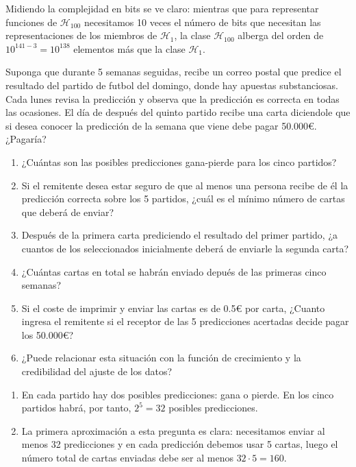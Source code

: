 \documentclass[a4paper, 11pt]{article}
\begin{document}
\begin{solucion}
          Midiendo la complejidad en bits se ve claro: mientras que para representar funciones de $\mathcal{H}_{100}$ necesitamos 10 veces el número de bits que necesitan las representaciones de los miembros de $\mathcal{H}_1$, la clase $\mathcal{H}_{100}$ alberga del orden de $10^{141-3} = 10^{138}$ elementos más que la clase $\mathcal{H}_1$.

      \begin{ejercicio}
          Suponga que durante 5 semanas seguidas, recibe un correo postal que predice el resultado del partido de futbol del domingo, donde hay apuestas substanciosas. Cada lunes revisa la predicción y observa que la predicción es correcta en todas las ocasiones. El día de después del quinto partido recibe una carta diciendole que si desea conocer la predicción de la semana que viene debe pagar 50.000€. ¿Pagaría?
          \begin{enumerate}
              \item ¿Cuántas son las posibles predicciones gana-pierde para los cinco partidos?
              \item Si el remitente desea estar seguro de que al menos una persona recibe de él la predicción correcta sobre los 5 partidos, ¿cuál es el mínimo número de cartas que deberá de enviar?
              \item Después de la primera carta prediciendo el resultado del primer partido, ¿a cuantos de los seleccionados inicialmente deberá de enviarle la segunda carta?
              \item ¿Cuántas cartas en total se habrán enviado depués de las primeras cinco semanas?
              \item Si el coste de imprimir y enviar las cartas es de 0.5€ por carta, ¿Cuanto ingresa el remitente si el receptor de las 5 predicciones acertadas decide pagar los 50.000€?
              \item ¿Puede relacionar esta situación con la función de crecimiento y la credibilidad del ajuste de los datos?
          \end{enumerate}
      \end{ejercicio}

      \begin{solucion}
          \begin{enumerate}
              \item En cada partido hay dos posibles predicciones: gana o pierde. En los cinco partidos habrá, por tanto, $2^5  = 32$ posibles predicciones.
              \item La primera aproximación a esta pregunta es clara: necesitamos enviar al menos 32 predicciones y en cada predicción debemos usar 5 cartas, luego el número total de cartas enviadas debe ser al menos $32\cdot5 = 160$.


\end{enumerate}
\end{solucion}
\end{solucion}
\end{document}

